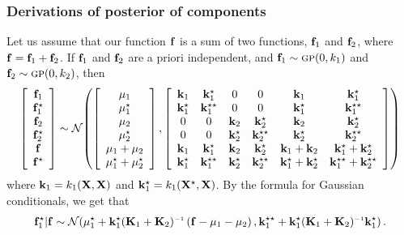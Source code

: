 \documentclass[twoside]{article}
\theoremstyle{definition}
\theoremstyle{remark}
\numberwithin{equation}{section}
\numberwithin{thm}{section}
\begin{document}
\subsubsection{Derivations of posterior of components}

Let us assume that our function ${\bf{f}}$ is a sum of two functions, ${\bf{f}}_1$ and ${\bf{f}}_2$, where ${\bf{f}} = {\bf{f}}_1 + {\bf{f}}_2$.  If ${\bf{f}}_1$ and ${\bf{f}}_2$ are a priori independent, and ${\bf{f}}_1 \sim {\textsc{gp}}( 0, k_1)$ and ${\bf{f}}_2 \sim {\textsc{gp}}( 0, k_2)$, then
\begin{align*}
\left[ \begin{array}{c} {\bf{f}}_1 \\ {\bf{f}}_1^\star \\ {\bf{f}}_2 \\ {\bf{f}}_2^\star \\ {\bf{f}} \\ {\bf{f}}^\star \end{array} \right]
\sim
\mathcal{N}\!\left(\left[ \begin{array}{c} {\bf{\mu}}_1 \\ {\bf{\mu}}_1^\star \\ {\bf{\mu}}_2 \\ {\bf{\mu}}_2^\star \\ {\bf{\mu}}_1 + {\bf{\mu}}_2 \\ {\bf{\mu}}_1^\star + {\bf{\mu}}_2^\star \end{array} \right]
,\left[ \begin{array}{cccccc} 
{\bf{k}}_1 & {\bf{k}}_1^\star & 0 & 0 & {\bf{k}}_1 & {\bf{k}}_1^\star \\ 
{\bf{k}}_1^\star & {\bf{k}}_1^{\star\star} & 0 & 0 & {\bf{k}}_1^\star & {\bf{k}}_1^{\star\star} \\
0 & 0 & {\bf{k}}_2 & {\bf{k}}_2^\star & {\bf{k}}_2 & {\bf{k}}_2^\star \\ 
0 & 0 & {\bf{k}}_2^\star & {\bf{k}}_2^{\star\star} & {\bf{k}}_2^\star & {\bf{k}}_2^{\star\star} \\
{\bf{k}}_1 & {\bf{k}}_1^\star & {\bf{k}}_2 & {\bf{k}}_2^\star & {\bf{k}}_1 + {\bf{k}}_2 & {\bf{k}}_1^\star + {\bf{k}}_2^\star \\ 
{\bf{k}}_1^\star & {\bf{k}}_1^{\star\star}  & {\bf{k}}_2^\star & {\bf{k}}_2^{\star\star}  & {\bf{k}}_1^\star + {\bf{k}}_2^\star & {\bf{k}}_1^{\star\star} + {\bf{k}}_2^{\star\star}\\
\end{array} \right]
\right)
\end{align*}
where ${\bf{k}}_1 = k_1( \mathbf{X}, \mathbf{X} )$ and ${\bf{k}}_1^\star = k_1( \mathbf{X}^\star, \mathbf{X} )$. By the formula for Gaussian conditionals, we get that
\begin{align*}
\vf_1^\star | \vf \sim \Nt{\vmu_1^\star + \vk_1^\star (\vK_1 + \vK_2)\inv \left( \vf - \vmu_1 - \vmu_2 \right) }
{\vk_1^{\star\star} + \vk_1^\star (\vK_1 + \vK_2)\inv \vk_1^\star }.
\end{align*}
\end{document}
